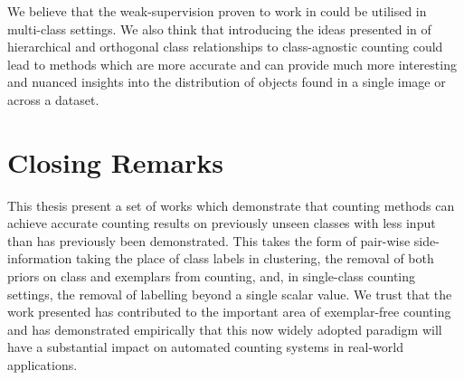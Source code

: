 \documentclass[../thesis.tex]{subfiles}
\begin{document}
We believe that the weak-supervision proven to work in  could be utilised in multi-class settings.
We also think that introducing the ideas presented in  of hierarchical and orthogonal class relationships to class-agnostic counting could lead to methods which are more accurate and can provide much more interesting and nuanced insights into the distribution of objects found in a single image or across a dataset. 

\section{Closing Remarks}
This thesis present a set of works which demonstrate that counting methods can achieve accurate counting results on previously unseen classes with less input than has previously been demonstrated.
This takes the form of pair-wise side-information taking the place of class labels in clustering, the removal of both priors on class and exemplars from counting, and, in single-class counting settings, the removal of labelling beyond a single scalar value.
We trust that the work presented has contributed to the important area of exemplar-free counting and has demonstrated empirically that this now widely adopted paradigm will have a substantial impact on automated counting systems in real-world applications.
\end{document}

